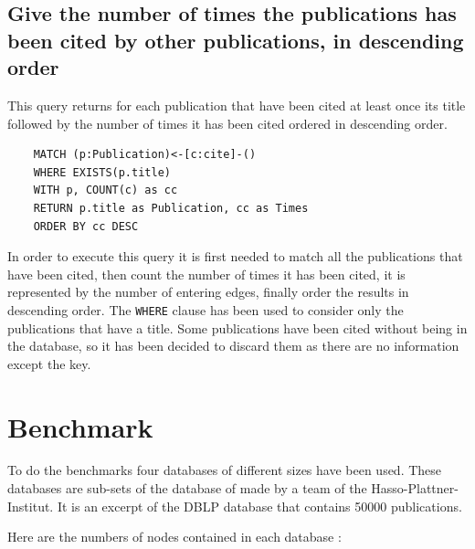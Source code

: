 \documentclass{article}
\begin{document}
\subsection{Give the number of times the publications has been cited by other publications, in descending order}
This query returns for each publication that have been cited at least once its title followed by the number of times it has been cited ordered in descending order.

\begin{lstlisting}
    MATCH (p:Publication)<-[c:cite]-()
    WHERE EXISTS(p.title)
    WITH p, COUNT(c) as cc
    RETURN p.title as Publication, cc as Times 
    ORDER BY cc DESC
\end{lstlisting}

In order to execute this query it is first needed to match all the publications that have been cited, then count the number of times it has been cited, it is represented by the number of entering edges, finally order the results in descending order. The \texttt{WHERE} clause has been used to consider only the publications that have a title. Some publications have been cited without being in the database, so it has been decided to discard them as there are no information except the key.

\section{Benchmark}
To do the benchmarks four databases of different sizes have been used. These databases are sub-sets of the database of made by a team of the Hasso-Plattner-Institut. It is an excerpt of the DBLP database that contains 50000 publications.

Here are the numbers of nodes contained in each database :
\end{document}
